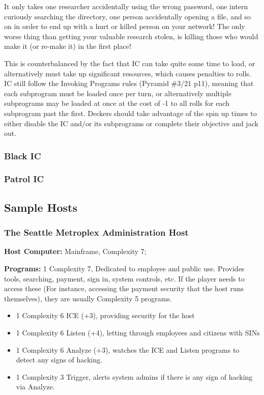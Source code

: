 \begin{multicols*}{3}
	It only takes one researcher accidentally using the wrong password, one intern curiously searching the directory, one person accidentally opening a file, and so on in order to end up with a hurt or killed person on your network! The only worse thing than getting your valuable research stolen, is killing those who would make it (or re-make it) in the first place!
	
	This is counterbalanced by the fact that IC can take quite some time to load, or alternatively must take up significant resources, which causes penalties to rolls. IC still follow the Invoking Programs rules (Pyramid \#3/21 p11), meaning that each subprogram must be loaded once per turn, or alternatively multiple subprograms may be loaded at once at the cost of -1 to all rolls for each subprogram past the first. Deckers should take advantage of the spin up times to either disable the IC and/or its subprograms or complete their objective and jack out.
	
	\subsubsection{Black IC}
	
	\subsubsection{Patrol IC}
	
	\subsection{Sample Hosts}
	
	\subsubsection{The Seattle Metroplex Administration Host}
	
	\textbf{Host Computer:}
	Mainframe, Complexity 7;
	
	\textbf{Programs:}
	1 Complexity 7, Dedicated to employee and public use. Provides tools, searching, payment, sign in, system controls, etc. If the player needs to access these (For instance, accessing the payment security that the host runs themselves), they are usually Complexity 5 programs.
	
	\begin{itemize}
		\itemsep 0pt
		\item 1 Complexity 6 ICE (+3), providing security for the host
		\item 1 Complexity 6 Listen (+4), letting through employees and citizens with SINs
		\item 1 Complexity 6 Analyze (+3), watches the ICE and Listen programs to detect any signs of hacking.
		\item 1 Complexity 3 Trigger, alerts system admins if there is any sign of hacking via Analyze.
	\end{itemize}
	

\end{multicols*}
